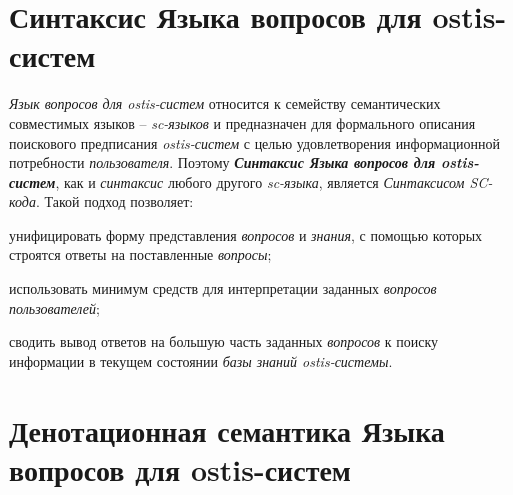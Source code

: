 \begin{SCn}
\begin{scnindent}
\end{scnindent}
\begin{scnindent}
\end{scnindent}
\begin{scnindent}
\end{scnindent}
\end{SCn}

\section{Синтаксис Языка вопросов для ostis-систем}
\label{sec_requests_syntax}

\textit{Язык вопросов для ostis-систем} относится к семейству семантических совместимых языков – \textit{sc-языков} и предназначен для формального описания поискового предписания \textit{ostis-систем} с целью удовлетворения информационной потребности \textit{пользователя}. Поэтому \textbf{\textit{Синтаксис Языка вопросов для ostis-систем}}, как и \textit{синтаксис} любого другого \textit{sc-языка}, является \textit{Синтаксисом SC-кода}. Такой подход позволяет:
\begin{textitemize}
	\item унифицировать форму представления \textit{вопросов} и \textit{знания}, с помощью которых строятся ответы на поставленные \textit{вопросы};
	\item использовать минимум средств для интерпретации заданных \textit{вопросов пользователей};
	\item сводить вывод ответов на большую часть заданных \textit{вопросов} к поиску информации в текущем состоянии \textit{базы знаний ostis-системы}.
\end{textitemize}

\section{Денотационная семантика Языка вопросов для ostis-систем}
\label{sec_requests_den_semantics}

